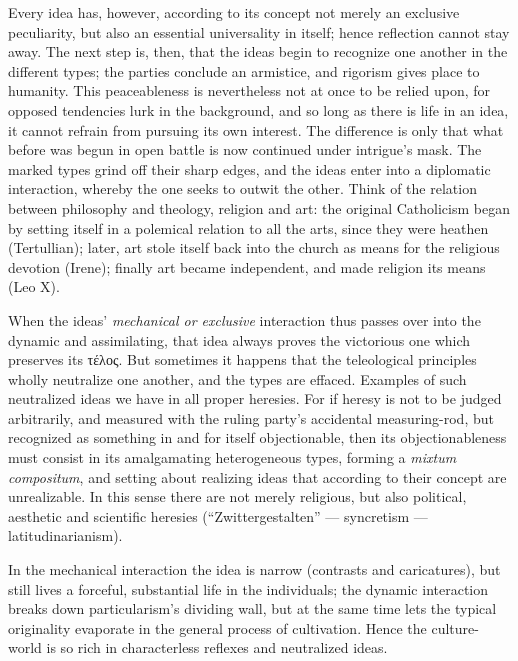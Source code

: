 \documentclass[12pt]{book}
\begin{document}
Every idea has, however, according to its concept not merely an exclusive
peculiarity, but also an essential universality in itself; hence reflection
cannot stay away. The next step is, then, that the ideas begin to recognize
one another in the different types; the parties conclude an armistice, and
rigorism gives place to humanity. This peaceableness is nevertheless not at
once to be relied upon, for opposed tendencies lurk in the background, and
so long as there is life in an idea, it cannot refrain from pursuing its own
interest. The difference is only that what before was begun in open battle
is now continued under intrigue's mask. The marked types grind off their
sharp edges, and the ideas enter into a diplomatic interaction, whereby the
one seeks to outwit the other. Think of the relation between philosophy and
theology, religion and art: the original Catholicism began by setting itself
in a polemical relation to all the arts, since they were heathen
(Tertullian); later, art stole itself back into the church as means for the
religious devotion (Irene); finally art became independent, and made
religion its means (Leo X).

When the ideas' \emph{mechanical or exclusive} interaction thus passes over
into the dynamic and assimilating, that idea always proves the victorious
one which preserves its τέλος. But sometimes it happens that the
teleological principles wholly neutralize one another, and the types are
effaced. Examples of such neutralized ideas we have in all proper heresies.
For if heresy is not to be judged arbitrarily, and measured with the ruling
party's accidental measuring-rod, but recognized as something in and for
itself objectionable, then its objectionableness must consist in its
amalgamating heterogeneous types, forming a \textit{mixtum compositum}, and
setting about realizing ideas that according to their concept are
unrealizable. In this sense there are not merely religious, but also
political, aesthetic and scientific heresies (``Zwittergestalten'' ---
syncretism --- latitudinarianism).

In the mechanical interaction the idea is narrow (contrasts and
caricatures), but still lives a forceful, substantial life in the
individuals; the dynamic interaction breaks down particularism's dividing
wall, but at the same time lets the typical originality evaporate in the
general process of cultivation. Hence the culture-world is so rich in
characterless reflexes and neutralized ideas.
\end{document}
